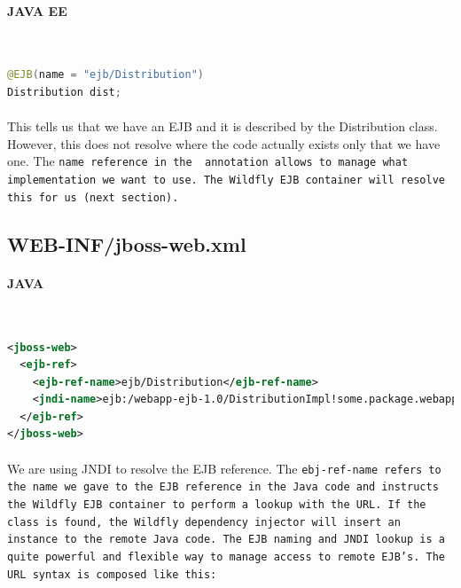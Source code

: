\documentclass[
10pt, %
letterpaper, %
oneside, %
headinclude,footinclude, %
BCOR5mm, %
]{scrartcl}
\begin{document}

\paragraph{JAVA EE}~
\begin{lstlisting}[language=Java]
@EJB(name = "ejb/Distribution")
Distribution dist;
\end{lstlisting}

\paragraph{} This tells us that we have an EJB and it is described by
the Distribution class. However, this does not resolve where the code
actually exists only that we have one. The \tt{name} reference
in the \tt{\@EJB} annotation allows to manage what implementation we
want to use. The Wildfly EJB container will resolve this for us (next
section). 


\subsection{WEB-INF/jboss-web.xml}


\paragraph{JAVA}~
\begin{lstlisting}[language=XML]
<jboss-web>
  <ejb-ref>
    <ejb-ref-name>ejb/Distribution</ejb-ref-name>
    <jndi-name>ejb:/webapp-ejb-1.0/DistributionImpl!some.package.webapp.ejb.Distribution</jndi-name>
  </ejb-ref>
</jboss-web>
\end{lstlisting}

\paragraph{} 
We are using JNDI to resolve the EJB reference. The
\tt{ebj-ref-name} refers to the name we gave to the EJB reference in
the Java code and instructs the Wildfly EJB container to perform a
lookup with the URL. If the class is found, the Wildfly dependency
injector will insert an instance to the remote Java code. The EJB
naming and JNDI lookup is a quite powerful and flexible way to manage
access to remote EJB's. The URL syntax is composed like this:
\end{document}
